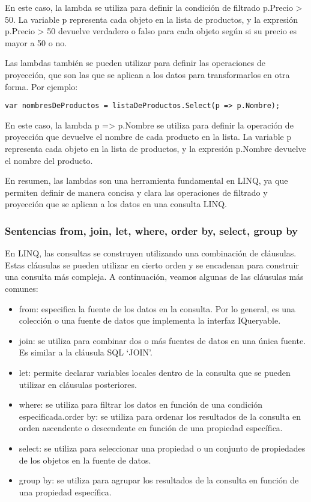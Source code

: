 \documentclass[executivepaper]{article}
\begin{document}
En este caso, la lambda se utiliza para definir la condición de filtrado p.Precio > 50. La variable p representa cada objeto en la lista de productos, y la expresión p.Precio > 50 devuelve verdadero o falso para cada objeto según si su precio es mayor a 50 o no.

Las lambdas también se pueden utilizar para definir las operaciones de proyección, que son las que se aplican a los datos para transformarlos en otra forma. Por ejemplo:

\begin{lstlisting}
var nombresDeProductos = listaDeProductos.Select(p => p.Nombre);
\end{lstlisting}

En este caso, la lambda p => p.Nombre se utiliza para definir la operación de proyección que devuelve el nombre de cada producto en la lista. La variable p representa cada objeto en la lista de productos, y la expresión p.Nombre devuelve el nombre del producto.

En resumen, las lambdas son una herramienta fundamental en LINQ, ya que permiten definir de manera concisa y clara las operaciones de filtrado y proyección que se aplican a los datos en una consulta LINQ.

\subsubsection*{Sentencias from, join, let, where, order by, select, group by}

En LINQ, las consultas se construyen utilizando una combinación de cláusulas. Estas cláusulas se pueden utilizar en cierto orden y se encadenan para construir una consulta más compleja. A continuación, veamos algunas de las cláusulas más comunes:

\begin{itemize}
    \item from: especifica la fuente de los datos en la consulta. Por lo general, es una colección o una fuente de datos que implementa la interfaz IQueryable.
    \item join: se utiliza para combinar dos o más fuentes de datos en una única fuente. Es similar a la cláusula SQL \enquote*{JOIN}.
    \item let: permite declarar variables locales dentro de la consulta que se pueden utilizar en cláusulas posteriores.
    \item where: se utiliza para filtrar los datos en función de una condición especificada.order by: se utiliza para ordenar los resultados de la consulta en orden ascendente o descendente en función de una propiedad específica.
    \item select: se utiliza para seleccionar una propiedad o un conjunto de propiedades de los objetos en la fuente de datos.
    \item group by: se utiliza para agrupar los resultados de la consulta en función de una propiedad específica.
\end{itemize}
\end{document}
